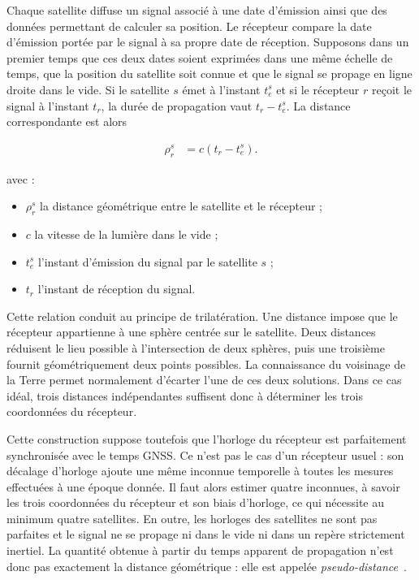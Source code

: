 Chaque satellite diffuse un signal associé à une date d'émission ainsi que des
données permettant de calculer sa position. Le récepteur compare la date
d'émission portée par le signal à sa propre date de réception. Supposons dans
un premier temps que ces deux dates soient exprimées dans une même échelle de
temps, que la position du satellite soit connue et que le signal se propage en
ligne droite dans le vide. Si le satellite $s$ émet à l'instant $t_e^s$ et si
le récepteur $r$ reçoit le signal à l'instant $t_r$, la durée de propagation
vaut $t_r-t_e^s$. La distance correspondante est alors

\begin{align}
\rho_r^s
&=
c\left(t_r-t_e^s\right).
\label{eq:geometric_time_range}
\end{align}

avec :

\begin{itemize}
    \item $\rho_r^s$ la distance géométrique entre le satellite et le
    récepteur ;
    \item $c$ la vitesse de la lumière dans le vide ;
    \item $t_e^s$ l'instant d'émission du signal par le satellite $s$ ;
    \item $t_r$ l'instant de réception du signal.
\end{itemize}

Cette relation conduit au principe de trilatération. Une distance impose que le
récepteur appartienne à une sphère centrée sur le satellite. Deux distances
réduisent le lieu possible à l'intersection de deux sphères, puis une troisième
fournit géométriquement deux points possibles. La connaissance du voisinage de
la Terre permet normalement d'écarter l'une de ces deux solutions. Dans ce cas
idéal, trois distances indépendantes suffisent donc à déterminer les trois
coordonnées du récepteur.

Cette construction suppose toutefois que l'horloge du récepteur est
parfaitement synchronisée avec le temps GNSS. Ce n'est pas le cas d'un
récepteur usuel : son décalage d'horloge ajoute une même inconnue temporelle à
toutes les mesures effectuées à une époque donnée. Il faut alors estimer quatre
inconnues, à savoir les trois coordonnées du récepteur et son biais d'horloge,
ce qui nécessite au minimum quatre satellites. En outre, les horloges des
satellites ne sont pas parfaites et le signal ne se propage ni dans le vide ni
dans un repère strictement inertiel. La quantité obtenue à partir du temps
apparent de propagation n'est donc pas exactement la distance géométrique :
elle est appelée \emph{pseudo-distance}~\cite[p.~591]{capderou2012}.


